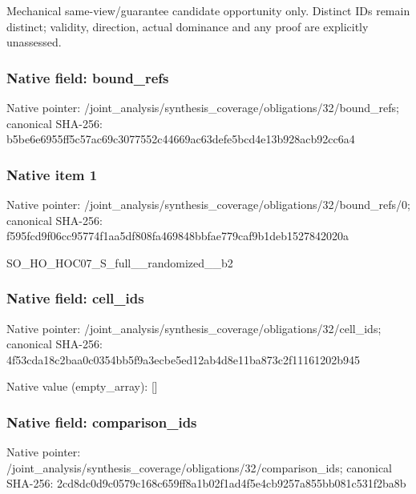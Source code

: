 \documentclass[10pt,a4paper]{article}
\begin{document}
\begingroup\raggedright\sloppy Mechanical same-view/\allowbreak{}guarantee candidate opportunity only. Distinct IDs remain distinct;\allowbreak{} validity,\allowbreak{} direction,\allowbreak{} actual dominance and any proof are explicitly unassessed.\par\endgroup

\subsubsection{Native field: bound\_\allowbreak{}refs}
Native pointer: /joint\_\allowbreak{}analysis/synthesis\_\allowbreak{}coverage/obligations/32/bound\_\allowbreak{}refs; canonical SHA-256: b5be6e6955ff5c57ac69c3077552c44669ac63defe5bcd4e13b928acb92cc6a4

\subsubsection{Native item 1}
Native pointer: /joint\_\allowbreak{}analysis/synthesis\_\allowbreak{}coverage/obligations/32/bound\_\allowbreak{}refs/0; canonical SHA-256: f595fcd9f06cc95774f1aa5df808fa469848bbfae779caf9b1deb1527842020a

\begingroup\raggedright\sloppy SO\_\allowbreak{}HO\_\allowbreak{}HOC07\_\allowbreak{}S\_\allowbreak{}full\_\allowbreak{}\_\allowbreak{}randomized\_\allowbreak{}\_\allowbreak{}b2\par\endgroup

\subsubsection{Native field: cell\_\allowbreak{}ids}
Native pointer: /joint\_\allowbreak{}analysis/synthesis\_\allowbreak{}coverage/obligations/32/cell\_\allowbreak{}ids; canonical SHA-256: 4f53cda18c2baa0c0354bb5f9a3ecbe5ed12ab4d8e11ba873c2f11161202b945

Native value (empty\_\allowbreak{}array): []

\subsubsection{Native field: comparison\_\allowbreak{}ids}
Native pointer: /joint\_\allowbreak{}analysis/synthesis\_\allowbreak{}coverage/obligations/32/comparison\_\allowbreak{}ids; canonical SHA-256: 2cd8dc0d9c0579c168c659ff8a1b02f1ad4f5e4cb9257a855bb081c531f2ba8b
\end{document}
